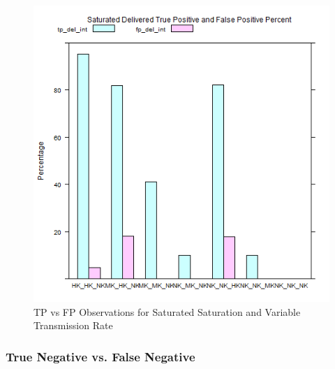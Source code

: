 	\begin{figure}[H]
	\centering
	\includegraphics[width=\textwidth]{Chap7/figures/plots/saturated_variable/tpvsfp_percent.png}
	\caption{TP vs FP Observations for Saturated Saturation and Variable Transmission Rate}
	\label{fig:sim:res:sat:variable:tpfp}
	\end{figure}
\subsubsection{True Negative vs. False Negative}
	
